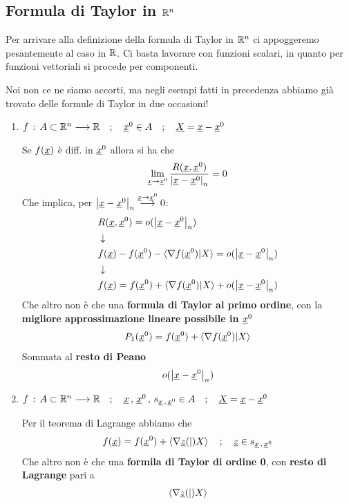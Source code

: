 \subsection{Formula di Taylor in $\mathbb{R}^n$}

Per arrivare alla definizione della formula di Taylor in $\mathbb{R}^n$ ci appoggeremo pesantemente al caso in $\mathbb{R}$. Ci basta lavorare con funzioni scalari, in quanto per funzioni vettoriali si procede per componenti.

Noi non ce ne siamo accorti, ma negli esempi fatti in precedenza abbiamo già trovato delle formule di Taylor in due occasioni!

\begin{enumerate}
	\item $f \, : \, A\subset \mathbb{R}^n \longrightarrow \mathbb{R} \quad ; \quad \underline{x}^0 \in A \quad ; \quad \underline{X} = \underline{x} - \underline{x}^0$
	
	Se $f(\underline{x})$ è diff. in $\underline{x}^0$ allora si ha che
	\begin{align}
		\underset{\underline{x} \rightarrow \underline{x}^0}{\lim} \, \frac{R(\underline{x}, \underline{x}^0)}{\left| \underline{x} -\underline{x}^0 \right|_n}=0
	\end{align}
	Che implica, per $\left| \underline{x} -\underline{x}^0 \right|_n \overset{\underline{x} \rightarrow \underline{x}^0}{\longrightarrow} 0$:
	\begin{align}
		{}&R(\underline{x}, \underline{x}^0) = o(\left| \underline{x} -\underline{x}^0 \right|_n) \nonumber \\ &\downarrow \nonumber \\
		&f(\underline{x}) - f(\underline{x}^0) - \braket{\nabla f(\underline{x}^0)|X} =  o(\left| \underline{x} -\underline{x}^0 \right|_n) \nonumber \\ &\downarrow \nonumber \\
		&f(\underline{x}) = f(\underline{x}^0) + \braket{\nabla f(\underline{x}^0)|X} +  o(\left| \underline{x} -\underline{x}^0 \right|_n)
	\end{align}
	Che altro non è che una \textbf{formula di Taylor al primo ordine}, con  la \textbf{migliore approssimazione lineare possibile in $\underline{x}^0$}
	\begin{align}
		P_1(\underline{x}^0) = f(\underline{x}^0) + \braket{\nabla f(\underline{x}^0)|X}
	\end{align}
	Sommata al \textbf{resto di Peano}
	\begin{align}
		o(\left| \underline{x} -\underline{x}^0 \right|_n)
	\end{align}
	
	\item $f \, : \, A\subset \mathbb{R}^n \longrightarrow \mathbb{R} \quad ; \quad \underline{x} \, , \, \underline{x}^0 \, , \, s_{\underline{x} \, , \, \underline{x}^0}\in A  \quad ; \quad \underline{X} = \underline{x} - \underline{x}^0$
	
	Per il teorema di Lagrange abbiamo che
	\begin{align}
		f(\underline{x})= f(\underline{x}^0) + \braket{\nabla \underline{z}(|)X} \quad ; \quad \underline{z} \in s_{\underline{x} \, , \, \underline{x}^0}
	\end{align}
	Che altro non è che una \textbf{formila di Taylor di ordine 0}, con \textbf{resto di Lagrange} pari a
	\begin{align}
		\braket{\nabla \underline{z}(|)X}
	\end{align}
\end{enumerate}

